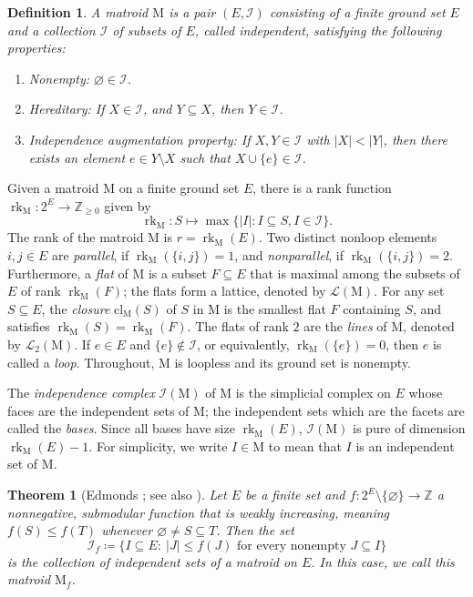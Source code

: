 \documentclass[11pt,a4paper,reqno]{amsart}
\theoremstyle{results}
\theoremstyle{definitions}
\newtheorem{definition}[thm]{Definition}
\def\Z{\mathbb{Z}}
\def\Z{\mathbb{Z}}
\def\calI{\mathcal{I}}
\def\calL{\mathcal{L}}
\newcommand{\abs}[1]{\left\lvert#1\right\rvert}
\newcommand{\cl}{\textrm{cl}}
\newcommand{\rk}{\operatorname{rk}}
\newcommand{\M}{\mathrm{M}}
\renewcommand{\emptyset}{\varnothing}
\newtheorem{theorem}[thm]{Theorem}
\newcommand{\Lines}{\mathcal{L}_2}
\begin{document}
\begin{definition}
\label{def:matroid-independent-sets}
A \emph{matroid} $\M$ is a pair $(E, \calI)$ consisting of a finite ground set $E$ and a collection $\calI$ of subsets of $E$, called \emph{independent}, satisfying the following properties:
\begin{enumerate}[leftmargin=20pt, font=\normalfont]
  \item \emph{Nonempty:} $\varnothing \in \calI$.
  \item \emph{Hereditary:} If $X \in \calI$, and $Y \subseteq X$, then $Y \in \calI$.
  \item \emph{Independence augmentation property:} If $X, Y \in \calI$ with $\abs{X} < \abs{Y}$, then there exists an element $e \in Y \setminus X$ such that $X \cup \{e\} \in \calI$.
\end{enumerate}
\end{definition}

Given a matroid $\M$ on a finite ground set $E$, there is a rank function $\rk_{\M} \colon 2^{E} \to \Z_{\geqslant 0}$ given by
\[
\rk_{\M} \colon S \mapsto \max \{\abs{I} \colon I \subseteq S,  I \in \calI\}.
\]
The rank of the matroid $\M$ is $r = \rk_{\M}(E)$. Two distinct nonloop elements $i, j \in E$ are \emph{parallel}, if
$\rk_{\M}(\{i, j\}) = 1$, and \emph{nonparallel}, if
$\rk_{\M}(\{i, j\}) = 2$.
Furthermore, a \emph{flat} of $\M$ is a subset $F \subseteq E$ that is maximal
among the subsets of $E$ of rank $\rk_{\M}(F)$; the flats form a lattice, denoted
by $\calL(\M)$. For any set $S \subseteq E$, the \emph{closure} $\cl_{\M}(S)$ of $S$ in $\M$ is the smallest flat $F$ containing $S$, and satisfies $\rk_{\M}(S) = \rk_{\M}(F)$.
The flats of rank $2$ are the \emph{lines} of $\M$, denoted by $\Lines(\M)$.
If $e \in E$ and $\{e\} \notin \calI$, or equivalently, $\rk_{\M}(\{e\}) = 0$, then $e$ is called a \emph{loop}.
Throughout, $\M$ is loopless and its ground set is nonempty.

The \emph{independence complex} $\calI(\M)$ of $\M$ is the simplicial complex on $E$ whose
faces are the independent sets of $\M$; the independent sets which are the facets are called the \emph{bases}.
Since all bases have size $\rk_{\M}(E)$, $\calI(\M)$ is pure of dimension $\rk_{\M}(E) - 1$. For simplicity, we write $I \in \M$ to mean that $I$ is
an independent set of $\M$.

\begin{theorem}[Edmonds {\cite{edmonds1970submodular}}; see also {\cite{oxley2011matroid}}]\label{thm:edmonds}
  Let $E$ be a finite set and $f \colon 2^E \setminus \{\emptyset\} \to \Z$ a
  nonnegative, submodular function that is \emph{weakly increasing}, meaning $f(S) \leqslant f(T)$
  whenever $\emptyset \neq S \subseteq T$. 
  Then the set
  \[
    \calI_f \coloneqq \big\{ I \subseteq E :\ |J| \leqslant f(J) \text{ for every nonempty } J \subseteq I \big\}
  \]
  is the collection of independent sets of a matroid on $E$. In this case, we call this matroid $\M_f$.
\end{theorem}
\end{document}
